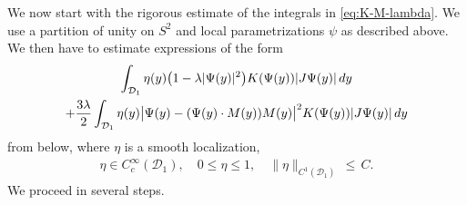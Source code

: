 \documentclass[reqno,makeidx,12pt]{amsart}
\theoremstyle{note}
\theoremstyle{definition}
\begin{document}
We now start with the rigorous estimate of the integrals in \eqref{eq:K-M-lambda}. We use a partition of unity on $S^2$ and local parametrizations $\psi$ as described above. 
We then have to estimate expressions of the form
\begin{gather}
	\int_{{\mathcal{D}}_1} \eta(y) \big(1-\lambda|\Psi(y)|^2\big)K(\Psi(y)) |J\Psi(y)|\,dy \notag\\
	+ \frac{3\lambda}{2}\int_{{\mathcal{D}}_1} \eta(y) \big|\Psi(y)-(\Psi(y)\cdot M(y)) M(y)\big|^2K(\Psi(y)) |J\Psi(y)|\,dy \label{eq:split-integrand}
\end{gather}
from below, where $\eta$ is a smooth localization,
\begin{align}
	\eta\in C^\infty_c({\mathcal{D}}_1),\quad 0\leq \eta\leq 1,\quad \|\eta\|_{C^1({\mathcal{D}}_1)}\,\leq\, C. \label{eq:eta-localize}
\end{align}
We proceed in several steps.
\end{document}
